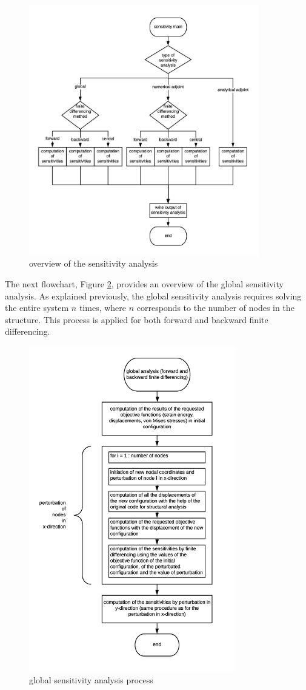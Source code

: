 \begin{figure}[ht]
  \centering
  \includegraphics[width=100mm]{images/sensitivitymain.png}
  \caption{overview of the sensitivity analysis}
  \label{fig:MainSensitivity}
\end{figure}
The next flowchart, Figure \ref{fig:Global}, provides an overview of the global sensitivity analysis. As explained previously, the global sensitivity analysis requires solving the entire system $n$ times, where $n$ corresponds to the number of nodes in the structure. This process is applied for both forward and backward finite differencing.\\[3pt]
\begin{figure}[ht]
  \centering
  \includegraphics[width=90mm]{images/globalanalysis.png}
  \caption{global sensitivity analysis process}
  \label{fig:Global}
\end{figure}

